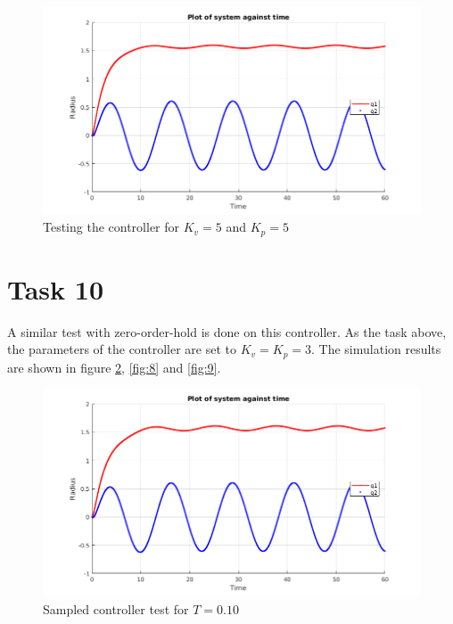\documentclass[a4paper,12pt,oneside,onecolumn]{article} %
\begin{document}
\begin{figure}[ht]
    \centering
    \includegraphics[scale=0.4]{cont2_5_5.png}
    \caption{Testing the controller for $K_v=5$ and $K_p=5$}
    \label{fig:6}
\end{figure} 



\section*{Task 10}
A similar test with zero-order-hold is done on this controller. As the task above, the parameters of the controller are set to $K_v = K_p = 3$. 
The simulation results are shown in figure \ref{fig:7}, \ref{fig:8} and \ref{fig:9}. 

\begin{figure}[ht]
    \centering
    \includegraphics[scale=0.4]{zoh2_10.png}
    \caption{Sampled controller test for $T=0.10$}
    \label{fig:7}
\end{figure} 
\end{document}
